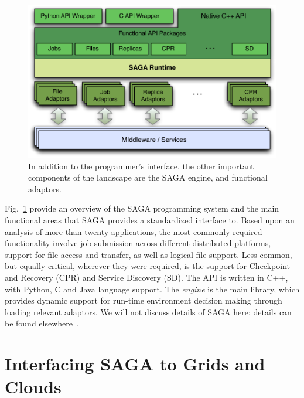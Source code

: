 \documentclass[conference,final]{IEEEtran}
\begin{document}
\begin{figure}[t]
\vspace{-2em}
\includegraphics[scale=0.5]{saga-figure02.pdf}
\caption{In addition to the programmer's interface,
  the other important components of the landscape are the SAGA engine,
  and functional adaptors.} \vspace{-2em}
\label{saga_figure}
\end{figure}

Fig.~\ref{saga_figure} provide an overview of the SAGA programming
system and the main functional areas that SAGA provides a standardized
interface to. Based upon an analysis of more than twenty applications,
the most commonly required functionality involve job submission across
different distributed platforms, support for file access and transfer,
as well as logical file support. Less common, but equally critical,
wherever they were required, is the support for Checkpoint and
Recovery (CPR) and Service Discovery (SD).  The API is written in C++,
with Python, C and Java language support. The {\it engine} is the main
library, which provides dynamic support for run-time environment
decision making through loading relevant adaptors. We will not discuss
details of SAGA here; details can be found elsewhere~\cite{saga_url}.

\section{Interfacing SAGA to Grids and Clouds}
\end{document}

